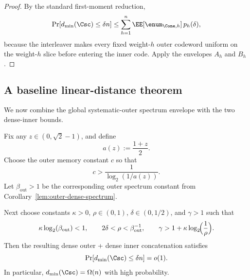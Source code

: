 \begin{proof}
By the standard first-moment reduction,
\[
\Pr[d_{\min}(\Csc)\le \delta n]
\le
\sum_{h=1}^{n}\EE[\enum_{\Cone,h}]\,p_h(\delta),
\]
because the interleaver makes every fixed weight-\(h\) outer codeword uniform on the weight-\(h\) slice before entering the inner code.
Apply the envelopes \(A_h\) and \(B_h\).
\end{proof}

\subsection{A baseline linear-distance theorem}
\label{sec:integration-dense-dense-baseline}

We now combine the global systematic-outer spectrum envelope with the two dense-inner bounds.

\begin{theorem}
\label{thm:dense-dense-integration}
Fix any \(z\in(0,\sqrt2-1)\), and define
\[
a(z):=\frac{1+z}{2}.
\]
Choose the outer memory constant \(c\) so that
\begin{equation}
\label{eq:dense-c-condition}
c>\frac{1}{\log_2(1/a(z))}.
\end{equation}
Let \(\beta_{\mathrm{out}}>1\) be the corresponding outer spectrum constant from
Corollary~\ref{lem:outer-dense-spectrum}.

Next choose constants \(\kappa>0\), \(\rho\in(0,1)\), \(\delta\in(0,1/2)\), and \(\gamma>1\) such that
\begin{equation}
\label{eq:dense-dense-parameter-conditions}
\kappa\log_2(\beta_{\mathrm{out}})<1,
\qquad
2\delta<\rho<\beta_{\mathrm{out}}^{-1},
\qquad
\gamma>1+\kappa\log_2\!\Bigl(\frac{1}{\rho}\Bigr).
\end{equation}
Then the resulting dense outer + dense inner concatenation satisfies
\[
\Pr[d_{\min}(\Csc)\le \delta n]=o(1).
\]
In particular, \(d_{\min}(\Csc)=\Omega(n)\) with high probability.
\end{theorem}

